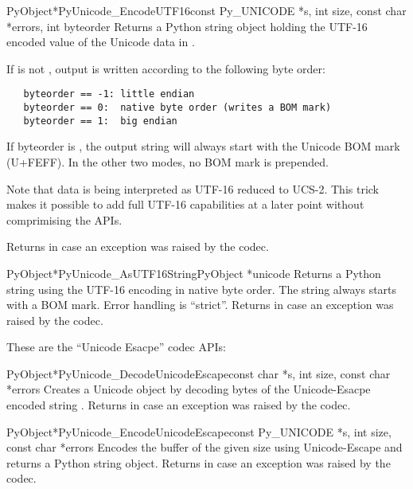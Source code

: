 \documentclass{manual}
\begin{document}
\begin{cfuncdesc}{PyObject*}{PyUnicode_EncodeUTF16}{const Py_UNICODE *s,
                                               int size,
                                               const char *errors,
                                               int byteorder}
Returns a Python string object holding the UTF-16 encoded value of the
Unicode data in .

If  is not , output is written according to the
following byte order:

\begin{verbatim}
   byteorder == -1: little endian
   byteorder == 0:  native byte order (writes a BOM mark)
   byteorder == 1:  big endian
\end{verbatim}

If byteorder is , the output string will always start with the
Unicode BOM mark (U+FEFF). In the other two modes, no BOM mark is
prepended.

Note that  data is being interpreted as UTF-16
reduced to UCS-2. This trick makes it possible to add full UTF-16
capabilities at a later point without comprimising the APIs.

Returns \NULL{} in case an exception was raised by the codec.
\end{cfuncdesc}

\begin{cfuncdesc}{PyObject*}{PyUnicode_AsUTF16String}{PyObject *unicode}
Returns a Python string using the UTF-16 encoding in native byte
order. The string always starts with a BOM mark. Error handling is
``strict''. Returns \NULL{} in case an exception was raised by the
codec.
\end{cfuncdesc}


These are the ``Unicode Esacpe'' codec APIs:

\begin{cfuncdesc}{PyObject*}{PyUnicode_DecodeUnicodeEscape}{const char *s,
                                               int size,
                                               const char *errors}
Creates a Unicode object by decoding  bytes of the Unicode-Esacpe
encoded string . Returns \NULL{} in case an exception was
raised by the codec.
\end{cfuncdesc}

\begin{cfuncdesc}{PyObject*}{PyUnicode_EncodeUnicodeEscape}{const Py_UNICODE *s,
                                               int size,
                                               const char *errors}
Encodes the  buffer of the given size using Unicode-Escape
and returns a Python string object.  Returns \NULL{} in case an
exception was raised by the codec.
\end{cfuncdesc}
\end{document}
